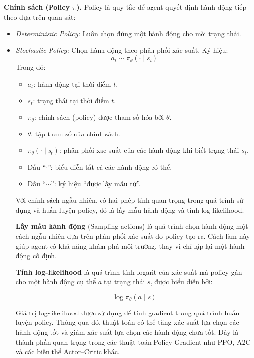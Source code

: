 \textbf{Chính sách (Policy $\pi$).}
Policy là quy tắc để agent quyết định hành động tiếp theo dựa trên quan sát:
\begin{itemize}
    \item \textit{Deterministic Policy:} Luôn chọn đúng một hành động cho mỗi
    trạng thái.
    \item \textit{Stochastic Policy:} Chọn hành động theo phân phối xác suất.
    Ký hiệu:
    \begin{equation}
        a_t \sim \pi_\theta(\cdot \mid s_t)
        \label{eq:stochastic_policy}
    \end{equation}
Trong đó:
\begin{itemize}[leftmargin=1.5cm]
    \item $a_t$: hành động tại thời điểm $t$.
    \item $s_t$: trạng thái tại thời điểm $t$.
    \item $\pi_\theta$: chính sách (policy) được tham số hóa bởi $\theta$.
    \item $\theta$: tập tham số của chính sách.
    \item $\pi_\theta(\cdot \mid s_t)$: phân phối xác suất của các hành động khi biết trạng thái $s_t$.
    \item Dấu ``$\cdot$'': biểu diễn tất cả các hành động có thể.
    \item Dấu ``$\sim$'': ký hiệu ``được lấy mẫu từ''.
\end{itemize}
Với chính sách ngẫu nhiên, có hai phép tính quan trọng trong quá trình sử dụng và
huấn luyện policy, đó là lấy mẫu hành động và tính log-likelihood.

\textbf{Lấy mẫu hành động} (Sampling actions) là quá trình chọn hành động một cách
ngẫu nhiên dựa trên phân phối xác suất do policy tạo ra. Cách làm này giúp agent có khả
năng khám phá môi trường, thay vì chỉ lặp lại một hành động cố định.

\textbf{Tính log-likelihood} là quá trình tính logarit của xác suất mà policy gán cho một
hành động cụ thể $a$ tại trạng thái $s$, được biểu diễn bởi:

\begin{equation}
    \log \pi_\theta(a \mid s)
    \label{eq:log_likelihood}
\end{equation}

Giá trị log-likelihood được sử dụng để tính gradient trong quá trình huấn luyện policy.
Thông qua đó, thuật toán có thể tăng xác suất lựa chọn các hành động tốt và giảm xác suất
lựa chọn các hành động chưa tốt. Đây là thành phần quan trọng trong các thuật toán
Policy Gradient như PPO, A2C và các biến thể Actor--Critic khác.


\end{itemize}
